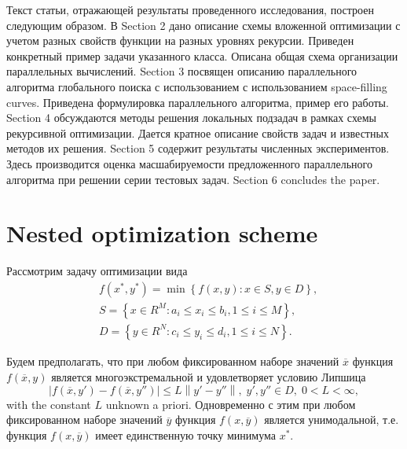 \documentclass{svproc}
\begin{document}
Текст статьи, отражающей результаты проведенного исследования, построен следующим образом. 
В Section 2 дано описание схемы вложенной оптимизации с учетом разных свойств функции на разных уровнях рекурсии. Приведен конкретный пример задачи указанного класса. Описана общая схема организации параллельных вычислений. 
Section 3 посвящен описанию параллельного алгоритма глобального поиска с использованием с использованием space-filling curves. Приведена формулировка параллельного алгоритма, пример его работы.
Section 4 обсуждаются методы решения локальных подзадач в рамках схемы рекурсивной оптимизации. Дается кратное описание свойств задач и известных методов их решения. 
Section 5 содержит результаты численных экспериментов. Здесь производится оценка масшабируемости предложенного параллельного алгоритма при решении серии тестовых задач.  
Section 6 concludes the paper.


\section{Nested optimization scheme}

Рассмотрим задачу оптимизации вида
\begin{eqnarray}\label{main_problem}
& f(x^\ast,y^\ast)=\min{\left\{f(x,y):x\in S, y\in D\right\}}, \nonumber \\
& S=\left\{x\in R^M: a_i\leq x_i \leq b_i, 1\leq i \leq M\right\}, \nonumber \\
& D=\left\{y\in R^N: c_i\leq y_i \leq d_i, 1\leq i \leq N\right\}. \nonumber
\end{eqnarray}

Будем предполагать, что при любом фиксированном наборе значений $\overline{x}$ функция $f(\overline{x},y)$ является многоэкстремальной и удовлетворяет условию Липшица
\[
\left|f(\overline{x},y')-f(\overline{x},y'')\right|\leq L\left\|y'-y''\right\|,\; y',y'' \in D,\; 0<L<\infty,
\]
with the constant $L$ unknown a priori.
Одновременно с этим при любом фиксированном наборе значений $\overline{y}$  функция $f(x,\overline{y})$ является унимодальной, т.е. функция $f(x,\overline{y})$ имеет единственную точку минимума $x^*$. 
\end{document}

